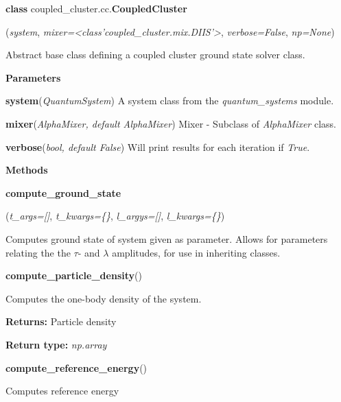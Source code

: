 \begin{tcolorbox}
    {\selectfont
    \textbf{class} coupled\_cluster.cc.\textbf{CoupledCluster}

    \hspace{1em}(\emph{system}, \emph{mixer=<class'coupled\_cluster.mix.DIIS'>}, 
        \emph{verbose=False}, \emph{np=None})

    \vspace{1em}
    Abstract base class defining a coupled cluster ground state 
    solver class.
    
    \vspace{1em}
    \textbf{Parameters}

    \hspace{2em}\textbf{system}(\emph{QuantumSystem}) A system class from the 
        \emph{quantum\_systems} module.

    \hspace{2em}\textbf{mixer}(\emph{AlphaMixer, default AlphaMixer}) Mixer - 
        Subclass of \emph{AlphaMixer} class.

    \hspace{2em}\textbf{verbose}(\emph{bool, default False}) Will print results 
        for each iteration if \emph{True}.

    \vspace{1em}
    \textbf{Methods}

    \hspace{2em} \textbf{compute\_ground\_state}
        \begin{adjustwidth}{4em}{}
        (\emph{t\_args=[]}, \emph{t\_kwargs=\{\}}, \emph{l\_argys=[]}, \emph{l\_kwargs=\{\}})

        Computes ground state of system given as parameter. Allows for parameters relating 
        the the $\tau$- and $\lambda$ amplitudes, for use in inheriting classes.
        \end{adjustwidth}
    
    \hspace{2em} \textbf{compute\_particle\_density}()
        \begin{adjustwidth}{4em}{}
        Computes the one-body density of the system.
   
        \textbf{Returns:} Particle density 
  
        \textbf{Return type:} \emph{np.array}
        \end{adjustwidth}
    
    \hspace{2em} \textbf{compute\_reference\_energy}()
        \begin{adjustwidth}{4em}{}
        Computes reference energy


\end{adjustwidth}}
\end{tcolorbox}

